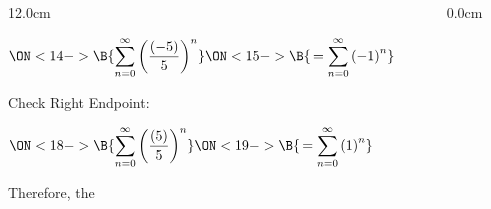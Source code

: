 \begin{frame}
\begin{columns}
\begin{column}{12.0cm}
\vspace{0.2cm}

$\displaystyle{\ON<14->{\B{\sum \limits_{n=0}^{\infty} \left(\frac{(-5)}{5}\right)^n}} \ON<15->{\B{\,= \sum \limits_{n=0}^{\infty} \left(-1\right)^n}}}$ \quad 
{}

\vspace{0.3cm}

Check Right Endpoint:  \\

\vspace{0.2cm}

$\displaystyle{\ON<18->{\B{\sum \limits_{n=0}^{\infty} \left(\frac{(5)}{5}\right)^n}} \ON<19->{\B{\,= \sum \limits_{n=0}^{\infty} \left(1\right)^n}}}$ \quad 
{}

\vspace{0.3cm}

Therefore, the 
\vspace{10.5cm}

\end{column}
\begin{column}{0.0cm}
	
\end{column}
\end{columns}
\end{frame}

